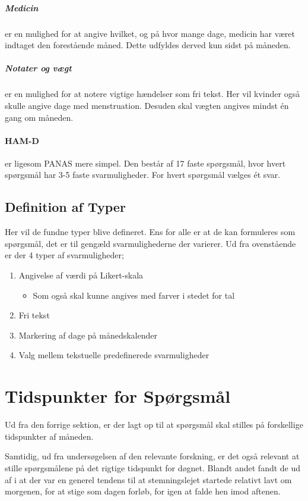 \subparagraph{Medicin} er en mulighed for at angive hvilket, og på hvor mange dage, medicin har været indtaget den forestående måned.
Dette udfyldes derved kun sidst på måneden.

\subparagraph{Notater og vægt} er en mulighed for at notere vigtige hændelser som fri tekst.
Her vil kvinder også skulle angive dage med menstruation.
Desuden skal vægten angives mindst én gang om måneden.

\paragraph{HAM-D} er ligesom PANAS mere simpel.
Den består af 17 faste spørgsmål, hvor hvert spørgsmål har 3-5 faste svarmuligheder.
For hvert spørgsmål vælges ét svar.

\subsection{Definition af Typer}
Her vil de fundne typer blive defineret.
Ens for alle er at de kan formuleres som spørgsmål, det er til gengæld svarmulighederne der varierer.
Ud fra ovenstående er der 4 typer af svarmuligheder;

\begin{enumerate}
\item Angivelse af værdi på Likert-skala
\begin{itemize}
\item Som også skal kunne angives med farver i stedet for tal
\end{itemize}
\item Fri tekst
\item Markering af dage på månedskalender
\item Valg mellem tekstuelle predefinerede svarmuligheder
\end{enumerate}

\section{Tidspunkter for Spørgsmål}
Ud fra den forrige sektion, er der lagt op til at spørgsmål skal stilles på forskellige tidspunkter af måneden.

Samtidig, ud fra undersøgelsen af den relevante forskning, er det også relevant at stille spørgsmålene på det rigtige tidspunkt for døgnet.
Blandt andet fandt de ud af i \citet{PANAS} at der var en generel tendens til at stemningslejet startede relativt lavt om morgenen, for at stige som dagen forløb, for igen at falde hen imod aftenen.

